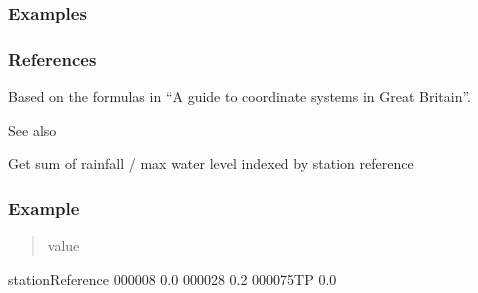 \documentclass[letterpaper,10pt,english]{sphinxmanual}
\begin{document}
\begin{fulllineitems}
\begin{quote}
\begin{description}
\begin{itemize}
\end{itemize}


\end{description}\end{quote}
\subsubsection*{Examples}

\begin{sphinxVerbatim}[commandchars=\\\{\}]
\PYG{p}{[}\PYG{p}{]} \PYG{p}{[}\PYG{p}{]}
\end{sphinxVerbatim}
\subsubsection*{References}

\sphinxAtStartPar
Based on the formulas in “A guide to coordinate systems in Great Britain”.

\sphinxAtStartPar
See also 

\end{fulllineitems}


\begin{fulllineitems}
\label{\detokenize{index:flood_tool.get_grouped_reading}}
\pysigstartsignatures
{}
\pysigstopsignatures
\sphinxAtStartPar
Get sum of rainfall / max water level indexed by station reference
\subsubsection*{Example}

\begin{sphinxVerbatim}[commandchars=\\\{\}]
 
\end{sphinxVerbatim}
\begin{quote}

\sphinxAtStartPar
value
\end{quote}

\sphinxAtStartPar
stationReference
000008              0.0
000028              0.2
000075TP            0.0

\end{fulllineitems}
\end{document}
